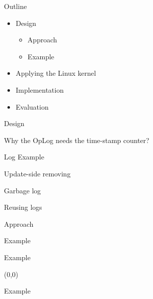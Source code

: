 \documentclass[english]{beamer} %
\begin{document}
\begin{frame}{Outline}
	\begin{itemize}
	\item Design
	\begin{itemize}
	\item Approach
	\item Example 
	\end{itemize}
	\item Applying the Linux kernel
	\item Implementation
	\item Evaluation
	\end{itemize}
\end{frame}


\begin{frame}{Design}
\end{frame}



\begin{frame}{Why the OpLog needs the time-stamp counter?}
\end{frame}



\begin{frame}{Log Example}
\end{frame}




\begin{frame}{Update-side removing}
\end{frame}


\begin{frame}{Garbage log}
\end{frame}


\begin{frame}{Reusing logs}
\end{frame}


\begin{frame}{Approach}
\end{frame}


\begin{frame}{Example}
\end{frame}


\begin{frame}{Example}
\begin{textblock}{1}(0,0)
\end{textblock}
\end{frame}

\begin{frame}{Example}
\end{frame}
\end{document}
